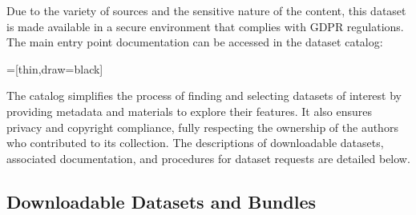 Due to the variety of sources and the sensitive nature of the content, this dataset is made available in a secure environment that complies with GDPR regulations. The main entry point documentation can be accessed in the dataset catalog:

\vspace{1em}
=[thin,draw=black]
\begin{center}
\end{center}

\noindent
The catalog simplifies the process of finding and selecting datasets of interest by providing metadata and materials to explore their features.  It also ensures privacy and copyright compliance, fully respecting the ownership of the authors who contributed to its collection.  The descriptions of downloadable datasets, associated documentation, and procedures for dataset requests are detailed below.

\subsection{Downloadable Datasets and Bundles}

\begin{table}[tb]
    \centering
    \small
    \caption{}\label{tab:sizes}
    
\end{table}

